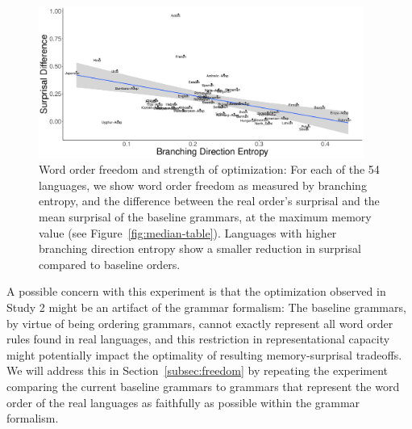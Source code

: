 \begin{figure}
\includegraphics[width=0.95\textwidth]{figures/surprisal-branching-entropy-REAL-invert.pdf}
	\caption{Word order freedom and strength of optimization: For each of the 54 languages, we show word order freedom as measured by branching entropy, and the difference between the real order's surprisal and the mean surprisal of the baseline grammars, at the maximum memory value (see Figure~\ref{fig:median-table}).
	Languages with higher branching direction entropy show a smaller reduction in surprisal compared to baseline orders. 
	}\label{fig:freedom-surp}
\end{figure}





A possible concern with this experiment is that the optimization observed in Study 2 might be an artifact of the grammar formalism:
The baseline grammars, by virtue of being ordering grammars, cannot exactly represent all word order rules found in real languages, and this restriction in representational capacity might potentially impact the optimality of resulting memory-surprisal tradeoffs.
We will address this in Section~\ref{subsec:freedom} by repeating the experiment comparing the current baseline grammars to grammars that represent the word order of the real languages as faithfully as  possible within the grammar formalism.


